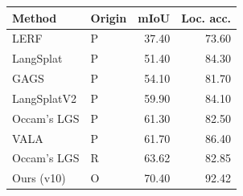 \begin{tabular}{llrr}
\toprule
Method & Origin & mIoU & Loc. acc. \\
\midrule
LERF \cite{vala} & P & 37.40 & 73.60 \\
LangSplat \cite{vala} & P & 51.40 & 84.30 \\
GAGS \cite{vala} & P & 54.10 & 81.70 \\
LangSplatV2 \cite{vala} & P & 59.90 & 84.10 \\
Occam's LGS \cite{vala} & P & 61.30 & 82.50 \\
VALA \cite{vala} & P & 61.70 & 86.40 \\
Occam's LGS & R & 63.62 & 82.85 \\
Ours (v10) & O & 70.40 & 92.42 \\
\bottomrule
\end{tabular}
